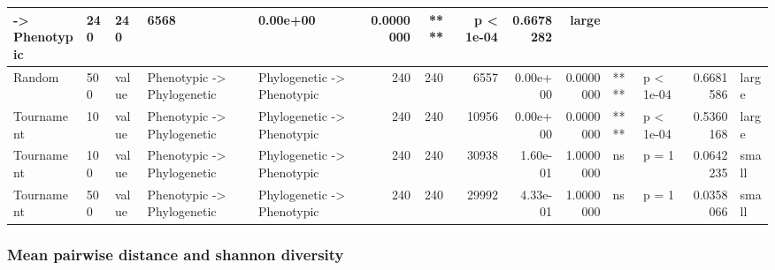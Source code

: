 \documentclass[]{book}
\begin{document}
\begin{table}
\begin{tabular}[t]{l|l|l|l|l|r|r|r|r|r|l|l|r|l}
    ->
Phenotypic & 240 & 240 & 6568 & 0.00e+00 & 0.0000000 & **** & p < 1e-04 & 0.6678282 & large\\
\hline
Random & 500 & value & Phenotypic
    ->
Phylogenetic & Phylogenetic
    ->
Phenotypic & 240 & 240 & 6557 & 0.00e+00 & 0.0000000 & **** & p < 1e-04 & 0.6681586 & large\\
\hline
Tournament & 10 & value & Phenotypic
    ->
Phylogenetic & Phylogenetic
    ->
Phenotypic & 240 & 240 & 10956 & 0.00e+00 & 0.0000000 & **** & p < 1e-04 & 0.5360168 & large\\
\hline
Tournament & 100 & value & Phenotypic
    ->
Phylogenetic & Phylogenetic
    ->
Phenotypic & 240 & 240 & 30938 & 1.60e-01 & 1.0000000 & ns & p = 1 & 0.0642235 & small\\
\hline
Tournament & 500 & value & Phenotypic
    ->
Phylogenetic & Phylogenetic
    ->
Phenotypic & 240 & 240 & 29992 & 4.33e-01 & 1.0000000 & ns & p = 1 & 0.0358066 & small\\
\hline
\end{tabular}
\end{table}

\hypertarget{mean-pairwise-distance-and-shannon-diversity-1}{%
\subsubsection{Mean pairwise distance and shannon diversity}\label{mean-pairwise-distance-and-shannon-diversity-1}}
\end{document}
